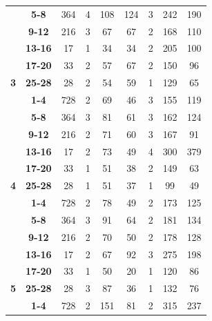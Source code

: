 \documentclass[sigconf,review]{acmart}
\begin{document}
\begin{table}
{\begin{tabular}{|c@{~}|c@{~}|c@{~}|c@{~}|c@{~}|c@{~}|c@{~}|c@{~}|c|}
 & \textbf{5-8} & 364 & 4 & 108 & 124 & 3 & 242 & 190 \\ \cline{2-9} 
 & \textbf{9-12} & 216 & 3 & 67 & 67 & \cellcolor[HTML]{EFEFEF}2 & 168 & 110 \\ \cline{2-9} 
 & \textbf{13-16} & 17 & \cellcolor[HTML]{C0C0C0}1 & 34 & 34 & \cellcolor[HTML]{EFEFEF}2 & 205 & 100 \\ \cline{2-9} 
 & \textbf{17-20} & 33 & \cellcolor[HTML]{EFEFEF}2 & 57 & 67 & \cellcolor[HTML]{EFEFEF}2 & 150 & 96 \\ \cline{2-9} 
\multirow{-6}{*}{\textbf{3}} & \textbf{25-28} & 28 & \cellcolor[HTML]{EFEFEF}2 & 54 & 59 & \cellcolor[HTML]{C0C0C0}1 & 129 & 65 \\ \hline
 & \textbf{1-4} & 728 & \cellcolor[HTML]{EFEFEF}2 & 69 & 46 & 3 & 155 & 119 \\ \cline{2-9} 
 & \textbf{5-8} & 364 & 3 & 81 & 61 & 3 & 162 & 124 \\ \cline{2-9} 
 & \textbf{9-12} & 216 & \cellcolor[HTML]{EFEFEF}2 & 71 & 60 & 3 & 167 & 91 \\ \cline{2-9} 
 & \textbf{13-16} & 17 & \cellcolor[HTML]{EFEFEF}2 & 73 & 49 & 4 & 300 & 379 \\ \cline{2-9} 
 & \textbf{17-20} & 33 & \cellcolor[HTML]{C0C0C0}1 & 51 & 38 & \cellcolor[HTML]{EFEFEF}2 & 149 & 63 \\ \cline{2-9} 
\multirow{-6}{*}{\textbf{4}} & \textbf{25-28} & 28 & \cellcolor[HTML]{C0C0C0}1 & 51 & 37 & \cellcolor[HTML]{C0C0C0}1 & 99 & 49 \\ \hline
 & \textbf{1-4} & 728 & \cellcolor[HTML]{EFEFEF}2 & 78 & 49 & \cellcolor[HTML]{EFEFEF}2 & 173 & 125 \\ \cline{2-9} 
 & \textbf{5-8} & 364 & 3 & 91 & 64 & \cellcolor[HTML]{EFEFEF}2 & 181 & 134 \\ \cline{2-9} 
 & \textbf{9-12} & 216 & \cellcolor[HTML]{EFEFEF}2 & 70 & 50 & \cellcolor[HTML]{EFEFEF}2 & 178 & 128 \\ \cline{2-9} 
 & \textbf{13-16} & 17 & \cellcolor[HTML]{EFEFEF}2 & 67 & 92 & 3 & 275 & 198 \\ \cline{2-9} 
 & \textbf{17-20} & 33 & \cellcolor[HTML]{C0C0C0}1 & 50 & 20 & \cellcolor[HTML]{C0C0C0}1 & 120 & 86 \\ \cline{2-9} 
\multirow{-6}{*}{\textbf{5}} & \textbf{25-28} & 28 & 3 & 87 & 36 & \cellcolor[HTML]{C0C0C0}1 & 132 & 76 \\ \hline
 & \textbf{1-4} & 728 & \cellcolor[HTML]{EFEFEF}2 & 151 & 81 & \cellcolor[HTML]{EFEFEF}2 & 315 & 237 \\ \cline{2-9} 

\end{tabular}}
\end{table}
\end{document}
